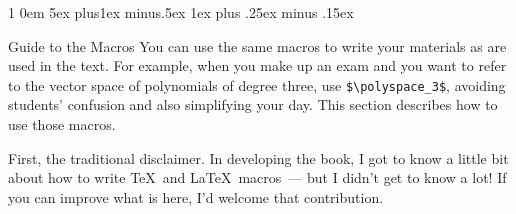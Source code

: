 \documentclass[titlepage]{article}
\makeatletter
\renewcommand{\section}{\@startsection{section}%
  {1}%
  {0em}%
  {5ex plus1ex minus.5ex}%
  {1ex plus .25ex minus .15ex}%
  {\large\bfseries\raggedright}}
\makeatother
\begin{document}













\section{Guide to the Macros}
You can use the same
macros to write your materials as are used in the text.
For example, when you make up an exam and you want to
refer to the vector space of polynomials of degree three, 
use \verb!$\polyspace_3$!,
avoiding students' confusion and also simplifying your day.  
This section describes how to use those macros.

First, the traditional disclaimer.
In developing the book, I got to know a little bit about how to write
\TeX\ and \LaTeX\ macros~--- but I didn't get to know a lot!
If you can improve what is here, I'd welcome that contribution.
\end{document}
